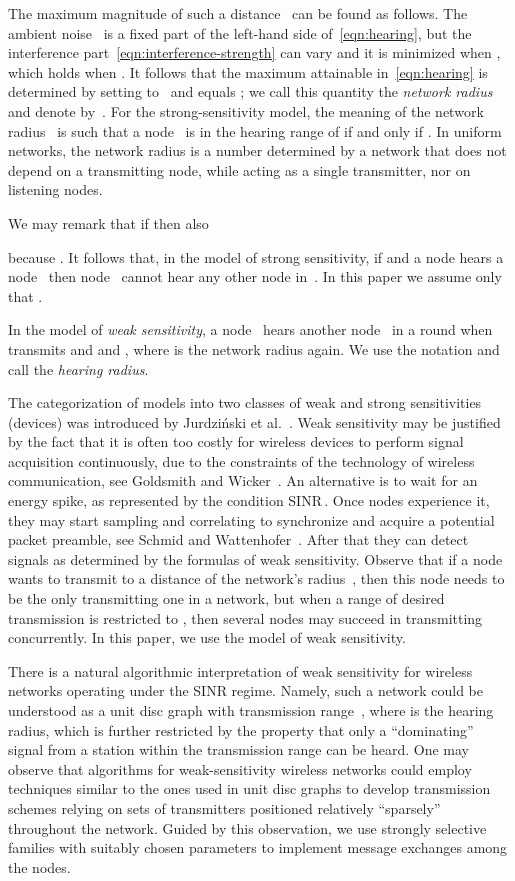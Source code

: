 \documentclass[11pt]{article}
\begin{document}
The maximum magnitude of such a distance~ can be found as follows.
The ambient noise~ is a fixed part of the left-hand side of~\eqref{eqn:hearing}, but the interference  part~\eqref{eqn:interference-strength} can vary and it is minimized when , which holds when .
It follows that the maximum  attainable in~\eqref{eqn:hearing} is determined by setting   to~  and equals ; we call this quantity the \emph{network radius} and denote by~.
For the strong-sensitivity model, the meaning of the network radius~ is such that a node~ is in the hearing range of  if and only if .
In uniform networks, the network radius is a number determined by a network that does not depend on a transmitting node, while acting as a single transmitter, nor on listening nodes.



We may remark that if   then also 

because . 
It follows that, in the model of strong sensitivity,  if  and a node  hears a node~ then node~ cannot hear any other node in~.
In this paper we assume only that .


In the model of \emph{weak sensitivity}, a node~ hears another node~ in a round when  transmits and   and , where  is the network radius again.
We use the notation  and call  the \emph{hearing radius}.




The  categorization of models into two classes of weak and strong sensitivities (devices) was introduced by Jurdzi\'nski et al.~\cite{JKS-ICALP-13}.
Weak sensitivity may be justified by the fact that it is often too costly for wireless devices to perform signal acquisition continuously, due to the constraints of the technology of wireless communication,  see Goldsmith and Wicker~\cite{GW-WN-02}. 
An alternative is  to wait for an energy spike, as represented by the condition SINR\,.
Once nodes experience it, they may start sampling and correlating to synchronize and acquire a potential packet preamble, see Schmid and Wattenhofer~\cite{SchmidW06}. 
After that they can detect signals as determined by the formulas of weak sensitivity.
Observe that  if a node wants to transmit to a distance of the network's radius~, then this node needs to be the only transmitting one in a network, but when a range of desired transmission is restricted to , then several nodes may succeed in transmitting concurrently.
In this paper, we use the model of weak sensitivity.


There is a natural algorithmic interpretation of weak sensitivity for wireless networks operating under the SINR regime.
Namely, such a network could be understood as a unit disc graph with transmission range~, where  is the hearing radius, which  is further restricted by the property  that only a ``dominating'' signal from a station within the transmission range can be heard. 
One may observe that algorithms for weak-sensitivity wireless networks could employ techniques similar to the ones used in unit disc  graphs to develop transmission schemes relying on sets of transmitters positioned relatively ``sparsely'' throughout the network. 
Guided by this observation, we use strongly selective families with suitably chosen parameters to implement message exchanges among the nodes.
\end{document}
